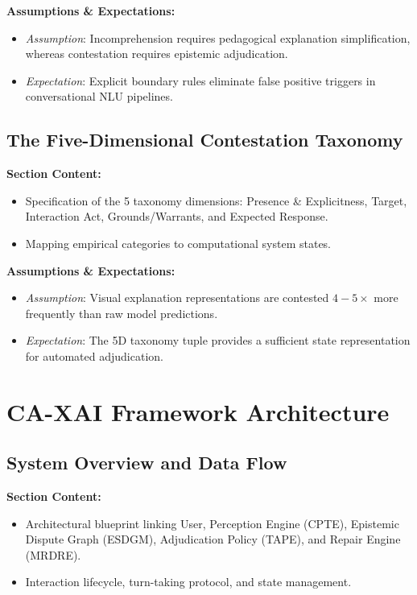 \documentclass[preprint,12pt,3p,times]{elsarticle}
\begin{document}
\textbf{Assumptions \& Expectations:}
\begin{itemize}
    \item \emph{Assumption}: Incomprehension requires pedagogical explanation simplification, whereas contestation requires epistemic adjudication.
    \item \emph{Expectation}: Explicit boundary rules eliminate false positive triggers in conversational NLU pipelines.
\end{itemize}

\subsection{The Five-Dimensional Contestation Taxonomy}
\textbf{Section Content:}
\begin{itemize}
    \item Specification of the 5 taxonomy dimensions: Presence \& Explicitness, Target, Interaction Act, Grounds/Warrants, and Expected Response.
    \item Mapping empirical categories to computational system states.
\end{itemize}

\textbf{Assumptions \& Expectations:}
\begin{itemize}
    \item \emph{Assumption}: Visual explanation representations are contested $4-5\times$ more frequently than raw model predictions.
    \item \emph{Expectation}: The 5D taxonomy tuple provides a sufficient state representation for automated adjudication.
\end{itemize}

\section{CA-XAI Framework Architecture}
\label{sec:architecture}

\subsection{System Overview and Data Flow}
\textbf{Section Content:}
\begin{itemize}
    \item Architectural blueprint linking User, Perception Engine (CPTE), Epistemic Dispute Graph (ESDGM), Adjudication Policy (TAPE), and Repair Engine (MRDRE).
    \item Interaction lifecycle, turn-taking protocol, and state management.
\end{itemize}
\end{document}
